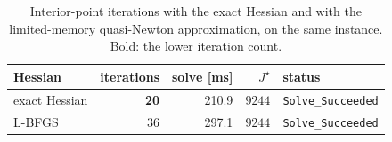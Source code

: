 \begin{table}[htbp]
  \centering
  \small
  \caption{Interior-point iterations with the exact Hessian and with the limited-memory quasi-Newton approximation, on the same instance. Bold: the lower iteration count.}
  \label{res:tab:hess}
  \begin{tabular}{lrrrl}
    \toprule
    Hessian & iterations & solve [ms] & $J^\star$ & status \\
    \midrule
    exact Hessian & \textbf{20} & 210.9 & $9244$ & \texttt{Solve\_Succeeded} \\
    L-BFGS & 36 & 297.1 & $9244$ & \texttt{Solve\_Succeeded} \\
    \bottomrule
  \end{tabular}
\end{table}

